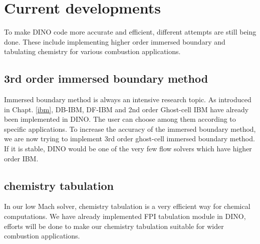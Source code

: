 \section{Current developments}
\label{Current-developments}
To make DINO code more accurate and efficient, different attempts are still being done. These include implementing higher order immersed boundary and tabulating chemistry for various combustion applications.
\subsection{3rd order immersed boundary method}
Immersed boundary method is always an intensive research topic. As introduced in Chapt. \ref{ibm}, DB-IBM, DF-IBM and 2nd order Ghost-cell IBM have already been implemented in DINO. The user can choose among them according to specific applications. To increase the accuracy of the immersed boundary method, we are now trying to implement 3rd order ghost-cell immersed boundary method. If it is stable, DINO would be one of the very few flow solvers which have higher order IBM.
\subsection{chemistry tabulation}
In our low Mach solver, chemistry tabulation is a very efficient way for chemical computations. We have already implemented FPI tabulation module in DINO, efforts will be done to make our chemistry tabulation suitable for wider combustion applications.
